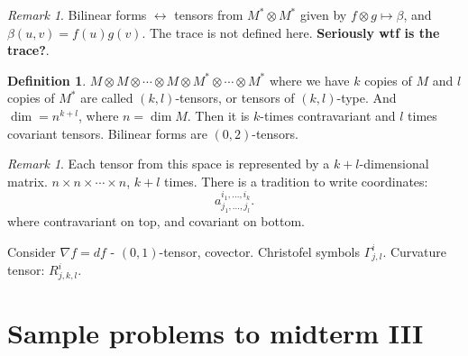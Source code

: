\documentclass[9pt,reqno,twoside]{amsbook}
\theoremstyle{plain}
\numberwithin{section}{chapter}
\numberwithin{equation}{chapter}
\theoremstyle{definition}
\newtheorem{Def}[theorem]{Definition}
\theoremstyle{remark}
\newtheorem{rem}[theorem]{Remark}
\theoremstyle{plain}
\newcommand{\tens}{\otimes}
\begin{document}
\begin{rem}
Bilinear forms $\leftrightarrow$ tensors from $M^* \tens M^*$ given by $f \tens g \mapsto \beta$, and $\beta(u,v) = f(u) g(v)$. The trace is not defined here. \textbf{Seriously wtf is the trace?}. 
\end{rem}

\begin{Def}
$M \tens M \tens \cdots \tens M \tens M^* \tens \cdots \tens M^*$ where we have $k$ copies of $M$ and $l$ copies of $M^*$ are called $(k,l)$-tensors, or tensors of $(k,l)$-type. And $\dim = n^{k + l}$, where $n = \dim M$. Then it is $k$-times contravariant and $l$ times covariant tensors. Bilinear forms are $(0,2)$-tensors. 
\end{Def}

\begin{rem}
Each tensor from this space is represented by a $k + l$-dimensional matrix. $n \times n \times \cdots \times n$, $k + l$ times. There is a tradition to write coordinates: $$
a_{j_1,...,j_l}^{i_1,...,i_k}.
$$
where contravariant on top, and covariant on bottom. 
\end{rem}

Consider $\nabla f = df$ - $(0,1)$-tensor, covector. Christofel symbols $\Gamma_{j,l}^i$. Curvature tensor: $R_{j,k,l}^i$. 







\chapter{Sample problems to midterm III}
\end{document}
